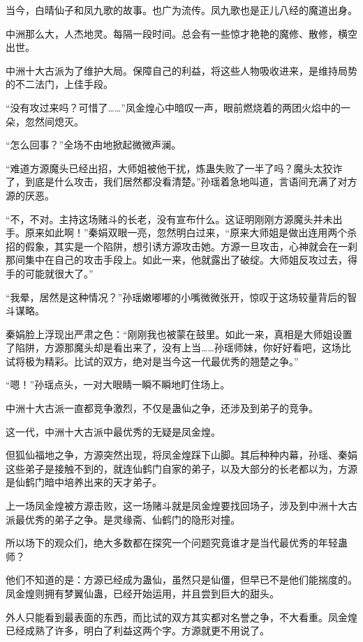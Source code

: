 \begin{this_body}
当今，白晴仙子和凤九歌的故事。也广为流传。凤九歌也是正儿八经的魔道出身。

中洲那么大，人杰地灵。每隔一段时间。总会有一些惊才艳艳的魔修、散修，横空出世。

中洲十大古派为了维护大局。保障自己的利益，将这些人物吸收进来，是维持局势的不二法门，上佳手段。

“没有攻过来吗？可惜了……”凤金煌心中暗叹一声，眼前燃烧着的两团火焰中的一朵，忽然间熄灭。

“怎么回事？”全场不由地掀起微微声澜。

“难道方源魔头已经出招，大师姐被他干扰，炼蛊失败了一半了吗？魔头太狡诈了，到底是什么攻击，我们居然都没看清楚。”孙瑶着急地叫道，言语间充满了对方源的厌恶。

“不，不对。主持这场赌斗的长老，没有宣布什么。这证明刚刚方源魔头并未出手。原来如此啊！”秦娟双眼一亮，忽然明白过来，“原来大师姐是做出连用两个杀招的假象，其实是一个陷阱，想引诱方源攻击她。方源一旦攻击，心神就会在一刹那间集中在自己的攻击手段上。如此一来，他就露出了破绽。大师姐反攻过去，得手的可能就很大了。”

“我晕，居然是这种情况？”孙瑶嫩嘟嘟的小嘴微微张开，惊叹于这场较量背后的智斗谋略。

秦娟脸上浮现出严肃之色：“刚刚我也被蒙在鼓里。如此一来，真相是大师姐设置了陷阱，方源那魔头却是看出来了，没有上当……孙瑶师妹，你好好看吧，这场比试将极为精彩。比试的双方，绝对是当今这一代最优秀的翘楚之争。”

“嗯！”孙瑶点头，一对大眼睛一瞬不瞬地盯住场上。

中洲十大古派一直都竞争激烈，不仅是蛊仙之争，还涉及到弟子的竞争。

这一代，中洲十大古派中最优秀的无疑是凤金煌。

但狐仙福地之争，方源突然出现，将凤金煌踩下山脚。其后种种内幕，孙瑶、秦娟这些弟子是接触不到的，就连仙鹤门自家的弟子，以及大部分的长老都以为，方源是仙鹤门暗中培养出来的天才弟子。

上一场凤金煌被方源击败，这一场赌斗就是凤金煌要找回场子，涉及到中洲十大古派最优秀的弟子之争。是灵缘斋、仙鹤门的隐形对撞。

所以场下的观众们，绝大多数都在探究一个问题究竟谁才是当代最优秀的年轻蛊师？

他们不知道的是：方源已经成为蛊仙，虽然只是仙僵，但早已不是他们能揣度的。凤金煌则拥有梦翼仙蛊，已经开始运用，并且尝到巨大的甜头。

外人只能看到最表面的东西，而比试的双方其实都对名誉之争，不大看重。凤金煌已经成熟了许多，明白了利益这两个字。方源就更不用说了。


\end{this_body}
